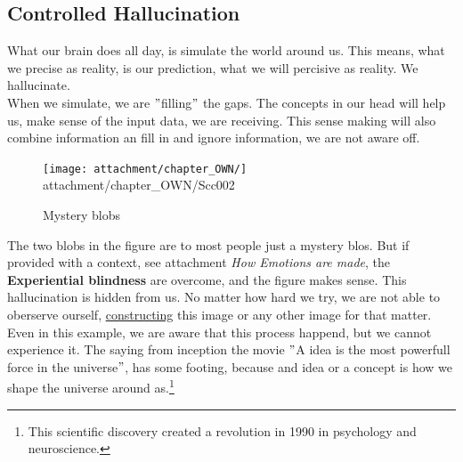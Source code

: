 \subsection{Controlled Hallucination}
What our brain does all day, is simulate the world around us. This means, what we precise as reality, is our prediction, what we will percisive as reality. We hallucinate.\\

When we simulate, we are $"$filling$"$ the gaps. The concepts in our head will help us, make sense of the input data, we are receiving. This sense making will also combine information an fill in and ignore information, we are not aware off.

\begin{figure}[H]
	\centering
	\texttt{[image: attachment/chapter\_OWN/]}
	{attachment/chapter_OWN/Scc002}
	\caption{Mystery blobs}
\end{figure}


The two blobs in the figure are to most people just a mystery blos. But if provided with a context, see attachment \textit{How Emotions are made}, the \textbf{Experiential blindness} are overcome, and the figure makes sense. This hallucination is hidden from us. No matter how hard we try, we are not able to oberserve ourself, \underline{constructing} this image or any other image for that matter. Even in this example, we are aware that this process happend, but we cannot experience it. The saying from inception the movie $"$A idea is the most powerfull force in the universe$"$, has some footing, because and idea or a concept is how we shape the universe around as.\footnote{This scientific discovery created a revolution in 1990 in psychology and neuroscience.}\\

